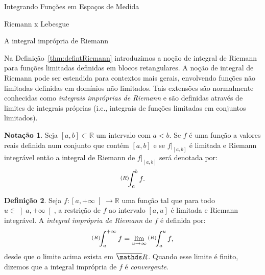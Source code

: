 \documentclass[oneside,final,11pt]{amsbook}
\newcommand{\R}{\mathds R}
\newcommand{\intRd}{\raise2pt\hbox{$\scriptstyle(R)$}\!\!\int}
\newcommand{\intR}{\raise2pt\hbox{$\scriptscriptstyle(R)$}\!\int}
\theoremstyle{remark}\newtheorem{exercise}{Exercício}[chapter]
\theoremstyle{remark}\newtheorem{*exercise}[exercise]{\hbox to 0pt{\hskip 0pt minus 1fil*}Exercício}
\theoremstyle{definition}\newtheorem{exdefin}{Definição}[chapter]
\theoremstyle{plain}\newtheorem{teo}{Teorema}[section]
\theoremstyle{plain}\newtheorem{lem}[teo]{Lema}
\theoremstyle{plain}\newtheorem{prop}[teo]{Proposição}
\theoremstyle{plain}\newtheorem{cor}[teo]{Corolário}
\theoremstyle{definition}\newtheorem{defin}[teo]{Definição}
\theoremstyle{remark}\newtheorem{rem}[teo]{Observação}
\theoremstyle{definition}\newtheorem{notation}[teo]{Notação}
\theoremstyle{definition}\newtheorem{convention}[teo]{Convenção}
\theoremstyle{definition}\newtheorem{example}[teo]{Exemplo}
\numberwithin{section}{chapter}
\numberwithin{equation}{section}
\begin{document}
\begin{chapter}{Integrando Funções em Espaços de Medida}
\begin{section}{Riemann x Lebesgue}
\begin{subsection}{A integral imprópria de Riemann}

Na Definição~\ref{thm:defintRiemann} introduzimos a noção de integral de Riemann
para funções limitadas definidas em blocos retangulares. A noção de integral de Riemann
pode ser estendida para contextos mais gerais, envolvendo funções não limitadas definidas
em domínios não limitados. Tais extensões são normalmente conhecidas como {\em integrais
impróprias de Riemann\/} e são definidas através de limites de integrais próprias (i.e.,
integrais de funções limitadas em conjuntos limitados).

\begin{notation}
Seja $[a,b]\subset\R$ um intervalo com $a<b$. Se $f$ é uma função a valores reais definida
num conjunto que contém $[a,b]$ e se $f\vert_{[a,b]}$ é limitada e Riemann integrável então a integral
de Riemann de $f\vert_{[a,b]}$ será denotada por:\index[simbolos]{$\intR_a^bf$}
\[\intRd_a^bf.\]
\end{notation}

\begin{defin}
Seja $f:\left[a,+\infty\right[\to\R$ uma função tal que para todo $u\in\left]a,+\infty\right[$,
a restrição de $f$ ao intervalo $[a,u]$ é limitada e Riemann integrável. A {\em integral
imprópria de Riemann\/}
de $f$ é definida por:
\[\intRd_a^{+\infty}f=\lim_{u\to\infty}\intRd_a^uf,\]
desde que o limite acima exista em $\overline\R$. Quando esse limite é finito, dizemos que
a integral imprópria de $f$ é {\em convergente}.
\end{defin}


\end{subsection}
\end{section}
\end{chapter}
\end{document}
